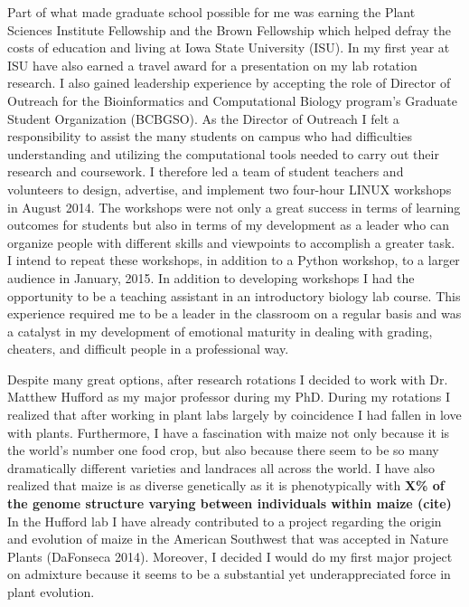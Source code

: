 \documentclass[12pt]{amsart}
\begin{document}
Part of what made graduate school possible for me was earning the Plant Sciences Institute Fellowship and the Brown Fellowship which helped defray the costs of education and living at Iowa State University (ISU).  
In my first year at ISU have also earned a travel award for a presentation on my lab rotation research.
I also gained leadership experience by accepting the role of Director of Outreach for the Bioinformatics and Computational Biology program's Graduate Student Organization (BCBGSO).
As the Director of Outreach I felt a responsibility to assist the many students on campus who had difficulties understanding and utilizing the computational tools needed to carry out their research and coursework.
I therefore led a team of student teachers and volunteers to design, advertise, and implement two four-hour LINUX workshops in August 2014.
The workshops were not only a great success in terms of learning outcomes for students but also in terms of my development as a leader who can organize people with different skills and viewpoints to accomplish a greater task.
I intend to repeat these workshops, in addition to a Python workshop, to a larger audience in January, 2015.
In addition to developing workshops I had the opportunity to be a teaching assistant in an introductory biology lab course.
This experience required me to be a leader in the classroom on a regular basis and was a catalyst in my development of emotional maturity in dealing with grading, cheaters, and difficult people in a professional way.

Despite many great options, after research rotations I decided to work with Dr. Matthew Hufford as my major professor during my PhD.
During my rotations I realized that after working in plant labs largely by coincidence I had fallen in love with plants.
Furthermore, I have a fascination with maize not only because it is the world's number one food crop, but also because there seem to be so many dramatically different varieties and landraces all across the world.
I have also realized that maize is as diverse genetically as it is phenotypically with \textbf{X\% of the genome structure varying between individuals within maize (cite)}
In the Hufford lab I have already contributed to a project regarding the origin and evolution of maize in the American Southwest that was accepted in Nature Plants (DaFonseca 2014).
Moreover, I decided I would do my first major project on admixture because it seems to be a substantial yet underappreciated force in plant evolution.
\end{document}
